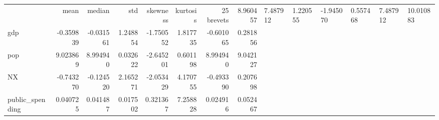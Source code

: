 \begin{tabular}{lrrrrrrr}
\toprule
 & mean & median & std & skewness & kurtosis & 25%
\midrule
brevets & 8.960457 & 7.487912 & 1.220555 & -1.945070 & 0.557468 & 7.487912 & 10.010883 \\
gdp & -0.359839 & -0.031561 & 1.248854 & -1.750552 & 1.817735 & -0.601065 & 0.281856 \\
pop & 9.023869 & 8.994940 & 0.032622 & -2.645201 & 0.601198 & 8.994940 & 9.042127 \\
NX & -0.743270 & -0.124520 & 2.165271 & -2.053429 & 4.170755 & -0.493390 & 0.207698 \\
public_spending & 0.040725 & 0.041487 & 0.017502 & 0.321367 & 7.258828 & 0.024916 & 0.052467 \\
\bottomrule
\end{tabular}
